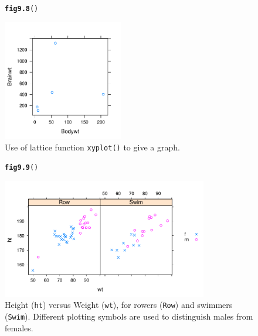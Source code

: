\documentclass[12pt, a4paper,  BCOR=8.25mm, DIV=15]{scrartcl}\usepackage[]{graphicx}\usepackage[]{color}
\makeatletter
\newcommand{\hlstd}[1]{\textcolor[rgb]{0.345,0.345,0.345}{#1}}%
\newcommand{\hlkwd}[1]{\textcolor[rgb]{0.737,0.353,0.396}{\textbf{#1}}}%
\newenvironment{kframe}{%
 \def\at@end@of@kframe{}%
 \ifinner\ifhmode%
  \def\at@end@of@kframe{\end{minipage}}%
  \begin{minipage}{\columnwidth}%
 \fi\fi%
 \def\FrameCommand##1{\hskip\@totalleftmargin \hskip-\fboxsep
 \colorbox{shadecolor}{##1}\hskip-\fboxsep
     \hskip-\linewidth \hskip-\@totalleftmargin \hskip\columnwidth}%
 \MakeFramed {\advance\hsize-\width
   \@totalleftmargin\z@ \linewidth\hsize
   \@setminipage}}%
 {\par\unskip\endMakeFramed%
 \at@end@of@kframe}
\newenvironment{knitrout}{}{} %
\newcommand{\txtt}[1]{{\texttt{#1}}}
\makeatother
\begin{document}
\begin{figure}[ht]
\begin{knitrout}
\color{fgcolor}\begin{kframe}
\begin{alltt}
\hlkwd{fig9.8}\hlstd{()}
\end{alltt}
\end{kframe}

{\centering \includegraphics[width=0.47\textwidth]{figs/gph-fig9_8e-1} 

}



\end{knitrout}
\caption{Use of lattice function \txtt{xyplot()} to give a graph.
  \label{fig:lat-gph}}
\end{figure}

\begin{figure}[ht]
\begin{knitrout}
\color{fgcolor}\begin{kframe}
\begin{alltt}
\hlkwd{fig9.9}\hlstd{()}
\end{alltt}
\end{kframe}

{\centering \includegraphics[width=0.8\textwidth]{figs/gph-fig9_9e-1} 

}



\end{knitrout}
\caption{Height (\texttt{ht}) versus Weight (\texttt{wt}), for
        rowers (\texttt{Row}) and swimmers (\texttt{Swim}).
        Different plotting symbols are used to distinguish males from
        females.}\label{fig:lattice-ais}
\end{figure}
\end{document}
